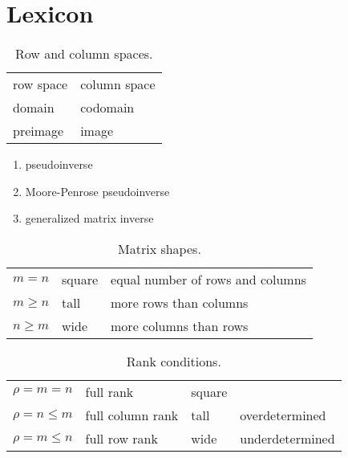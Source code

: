 \chapter{Lexicon}

\begin{table}[htdp]
\caption[Row and column spaces]{Row and column spaces.}
\begin{center}
\begin{tabular}{ll}
%
  row space & column space \\
  domain    & codomain \\
  preimage  & image \\
%
\end{tabular}
\end{center}
\label{tab:appendix:jargon}
\end{table}
\begin{enumerate}
%
  \item pseudoinverse
  \item Moore-Penrose pseudoinverse
  \item generalized matrix inverse
%
\end{enumerate}
\begin{table}[htdp]
\caption[Matrix shapes]{Matrix shapes.}
\begin{center}
\begin{tabular}{lll}
%
  $m=n$ & square & equal number of rows and columns \\
%
  $m\ge n$ & tall & more rows than columns \\
%
  $n\ge m$ & wide & more columns than rows \\
%
\end{tabular}
\end{center}
\label{tab:matrix shapes}
\end{table}

\begin{table}[htdp]
\caption[Rank conditions]{Rank conditions.}
\begin{center}
\begin{tabular}{llll}
%
  $\rho=m=n$ & full rank & square \\
%
  $\rho=n\le m$ & full column rank & tall & overdetermined \\
%
  $\rho=m\le n$ & full row rank & wide & underdetermined \\
%
\end{tabular}
\end{center}
\label{tab:matrix shapes and rank}
\end{table}


\endinput